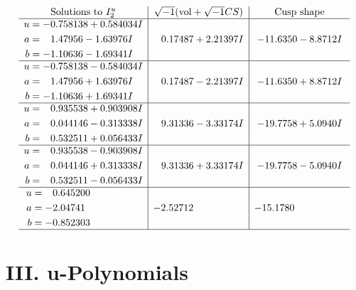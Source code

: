 \documentclass[1p]{elsarticle_modified}
\theoremstyle{definition}
\newcommand{\I}{\sqrt{-1}}
\begin{document}
$$\begin{array}{c|c|c}  
\text{Solutions to }I^u_{2}& \I (\text{vol} + \sqrt{-1}CS) & \text{Cusp shape}\\
 \hline 
\begin{aligned}
u &= -0.758138 + 0.584034 I \\
a &= \phantom{-}1.47956 - 1.63976 I \\
b &= -1.10636 - 1.69341 I\end{aligned}
 & \phantom{-}0.17487 + 2.21397 I & -11.6350 - 8.8712 I \\ \hline\begin{aligned}
u &= -0.758138 - 0.584034 I \\
a &= \phantom{-}1.47956 + 1.63976 I \\
b &= -1.10636 + 1.69341 I\end{aligned}
 & \phantom{-}0.17487 - 2.21397 I & -11.6350 + 8.8712 I \\ \hline\begin{aligned}
u &= \phantom{-}0.935538 + 0.903908 I \\
a &= \phantom{-}0.044146 - 0.313338 I \\
b &= \phantom{-}0.532511 + 0.056433 I\end{aligned}
 & \phantom{-}9.31336 - 3.33174 I & -19.7758 + 5.0940 I \\ \hline\begin{aligned}
u &= \phantom{-}0.935538 - 0.903908 I \\
a &= \phantom{-}0.044146 + 0.313338 I \\
b &= \phantom{-}0.532511 - 0.056433 I\end{aligned}
 & \phantom{-}9.31336 + 3.33174 I & -19.7758 - 5.0940 I \\ \hline\begin{aligned}
u &= \phantom{-}0.645200\phantom{ +0.000000I} \\
a &= -2.04741\phantom{ +0.000000I} \\
b &= -0.852303\phantom{ +0.000000I}\end{aligned}
 & -2.52712\phantom{ +0.000000I} & -15.1780\phantom{ +0.000000I}\\
 \hline 
 \end{array}$$\newpage
\newpage\renewcommand{\arraystretch}{1}
\centering \section*{ III. u-Polynomials}
\end{document}
